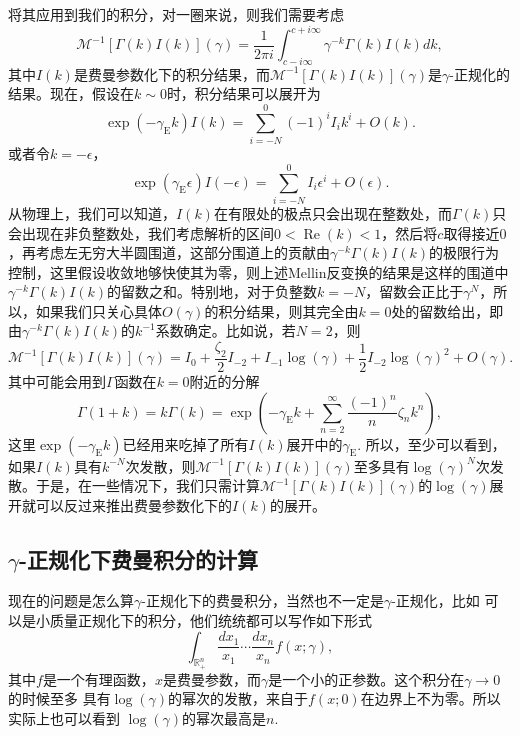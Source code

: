 \documentclass[11pt]{article}
\theoremstyle{definition}
\theoremstyle{plain}
\begin{document}
将其应用到我们的积分，对一圈来说，则我们需要考虑
\[
	\mathcal M^{-1}[\Gamma(k)I(k)](\gamma)=\frac{1}{2\pi i}\int_{c-i\infty}^{c+i\infty}\gamma^{-k}\Gamma(k)I(k)dk,
\]
其中$I(k)$是费曼参数化下的积分结果，而$\mathcal M^{-1}[\Gamma(k)I(k)](\gamma)$是$\gamma$-正规化的结果。现在，假设在$k\sim 0$时，积分结果可以展开为
\[
	\exp (-\gamma_{\mathrm{E}} k)I(k)=\sum_{i=-N}^0 (-1)^iI_i k^i+O(k).
\]
或者令$k=-\epsilon$，
\[
	\exp (\gamma_{\mathrm{E}} \epsilon)I(-\epsilon)=\sum_{i=-N}^0 I_i \epsilon^i+O(\epsilon).
\]
从物理上，我们可以知道，$I(k)$在有限处的极点只会出现在整数处，而$\Gamma(k)$只会出现在非负整数处，我们考虑解析的区间$0<\operatorname{Re}(k)<1$，然后将$c$取得接近$0$，再考虑左无穷大半圆围道，这部分围道上的贡献由$\gamma^{-k}\Gamma(k)I(k)$的极限行为控制，这里假设收敛地够快使其为零，则上述Mellin反变换的结果是这样的围道中$\gamma^{-k}\Gamma(k)I(k)$的留数之和。特别地，对于负整数$k=-N$，留数会正比于$\gamma^N$，所以，如果我们只关心具体$O(\gamma)$的积分结果，则其完全由$k=0$处的留数给出，即由$\gamma^{-k}\Gamma(k)I(k)$的$k^{-1}$系数确定。比如说，若$N=2$，则
\[
	\mathcal M^{-1}[\Gamma(k)I(k)](\gamma)=I_0+\frac{\zeta_2}{2}I_{-2}+I_{-1}\log(\gamma)+\frac{1}{2}I_{-2}\log(\gamma)^2 + O(\gamma).
\]
其中可能会用到$\Gamma$函数在$k=0$附近的分解
\[
	\Gamma(1+k)=k\Gamma(k)=\exp \left(-\gamma_{\mathrm{E}} k+\sum_{n=2}^{\infty} \frac{(-1)^{n}}{n} \zeta_{n} k^{n}\right),
\]
这里$\exp (-\gamma_{\mathrm{E}} k)$已经用来吃掉了所有$I(k)$展开中的$\gamma_{\mathrm{E}}$. 所以，至少可以看到，如果$I(k)$具有$k^{-N}$次发散，则$\mathcal M^{-1}[\Gamma(k)I(k)](\gamma)$至多具有$\log(\gamma)^N$次发散。于是，在一些情况下，我们只需计算$\mathcal M^{-1}[\Gamma(k)I(k)](\gamma)$的$\log(\gamma)$展开就可以反过来推出费曼参数化下的$I(k)$的展开。

\subsection{$\gamma$-正规化下费曼积分的计算}

现在的问题是怎么算$\gamma$-正规化下的费曼积分，当然也不一定是$\gamma$-正规化，比如
可以是小质量正规化下的积分，他们统统都可以写作如下形式
\[
	\int_{\mathbb R_+^n}\frac{dx_1}{x_1}\cdots \frac{dx_n}{x_n}f(x;\gamma),
\]
其中$f$是一个有理函数，$x$是费曼参数，而$\gamma$是一个小的正参数。这个积分在$\gamma\to 0$的时候至多
具有$\log(\gamma)$的幂次的发散，来自于$f(x;0)$在边界上不为零。所以实际上也可以看到
$\log(\gamma)$的幂次最高是$n$.
\end{document}
